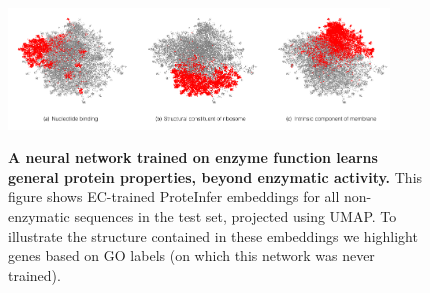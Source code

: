 \begin{figure}[t!]
    \centering
    \DIFdelbeginFL %
\DIFdelFL{0pt
        }%
{%
}
\DIFdelFL{~ %
    }%
\DIFdelFL{0pt
        }%
{%
}
\DIFdelFL{~ %
    }%
\DIFdelFL{0pt
        }%
{%
}
\DIFdelendFL \DIFaddbeginFL \includegraphics[width=0.9\textwidth]{combined_subfigs_a.pdf}
    \DIFaddendFL \caption{\textbf{A neural network trained on enzyme function learns general protein properties, beyond enzymatic activity.} This figure shows EC-trained ProteInfer embeddings for all non-enzymatic sequences in the test set, projected using UMAP. To illustrate the structure contained in these embeddings we highlight genes based on GO labels (on which this network was never trained).}\label{fig:unsupervised_embedding}
\end{figure}
